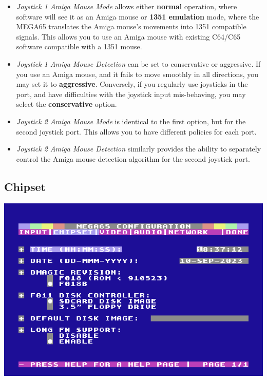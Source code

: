 \begin{itemize}
  \item{\em Joystick 1 Amiga Mouse Mode} allows either {\bf normal} operation,
  where software will see it as an Amiga mouse or {\bf 1351 emulation} mode, where the MEGA65 translates the Amiga mouse's movements into 1351 compatible  signals. This allows you to use an Amiga mouse with existing C64/C65 software compatible with a 1351 mouse.
  \item{\em Joystick 1 Amiga Mouse Detection} can be set to conservative or aggressive. If you use an Amiga mouse, and it fails to move smoothly in all directions, you may set it to {\bf aggressive}. Conversely, if you regularly use joysticks in the port, and have difficulties with the joystick input mis-behaving, you may select the {\bf conservative} option.
  \item{\em Joystick 2 Amiga Mouse Mode} is identical to the first option, but for the second joystick port. This allows you to have different policies for each port.
  \item{\em Joystick 2 Amiga Mouse Detection} similarly provides the ability to separately control the Amiga mouse detection algorithm for the second joystick port.
\end{itemize}


\subsection{Chipset}

\includegraphics[width=\linewidth]{images/ss-m65config-2.png}

